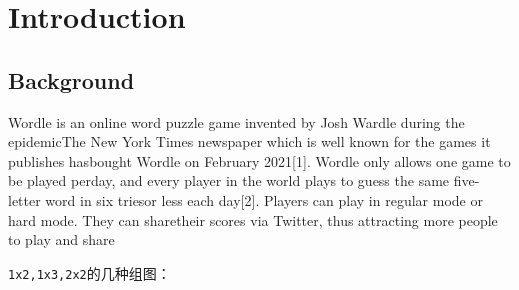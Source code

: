 \documentclass[12pt]{ctexart}
\begin{document}
\maketitle  %

\tableofcontents  %




\section{Introduction}
\subsection{Background}
Wordle is an online word puzzle game invented by Josh Wardle during the epidemicThe New York Times newspaper which is well known for the games it publishes hasbought Wordle on February 2021[1]. Wordle only allows one game to be played perday, and every player in the world plays to guess the same five-letter word in six triesor less each day[2]. Players can play in regular mode or hard mode. They can sharetheir scores via Twitter, thus attracting more people to play and share







\verb|1x2,1x3,2x2|的几种组图：
\end{document}
